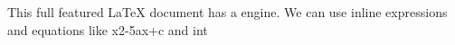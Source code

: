 \markdownRendererUlBeginTight
\markdownRendererUlItem This full featured LaTeX document has a  engine.\markdownRendererUlItemEnd 
\markdownRendererUlItem We can use \markdownRendererDollarSign{}inline\markdownRendererDollarSign{} expressions and equations like \markdownRendererDollarSign{}x\markdownRendererCircumflex{}2-5ax+c\markdownRendererDollarSign{} and \markdownRendererDollarSign{}\markdownRendererBackslash{}int \markdownRendererDollarSign{}\markdownRendererUlItemEnd 
\markdownRendererUlEndTight \relax